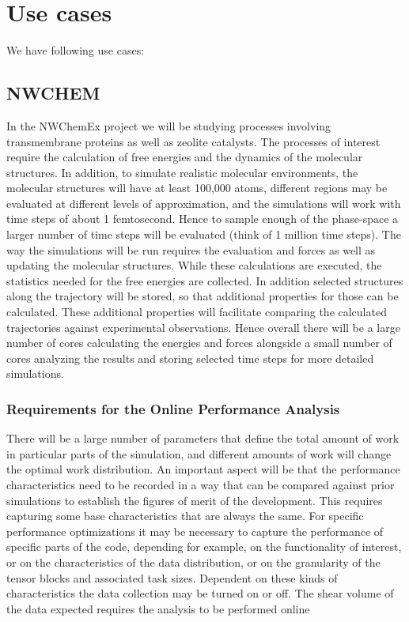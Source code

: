 \section{Use cases}
We have following use cases:

\subsection{NWCHEM}
In the NWChemEx project we will be studying processes involving transmembrane proteins as well as zeolite catalysts. The processes of interest require the calculation of free energies and the dynamics of the molecular structures. In addition, to simulate realistic molecular environments, the molecular structures will have at least 100,000 atoms, different regions may be evaluated at different levels of approximation, and the simulations will work with time steps of about 1 femtosecond.  Hence to sample enough of the phase-space a larger number of time steps will be evaluated (think of 1 million time steps). The way the simulations will be run requires the evaluation and forces as well as updating the molecular structures. While these calculations are executed, the statistics needed for the free energies are collected. In addition selected structures along the trajectory will be stored, so that additional properties for those can be calculated. These additional properties will facilitate comparing the calculated trajectories against experimental observations.  Hence overall there will be a large number of cores calculating the energies and forces alongside a small number of cores analyzing the results and storing selected time steps for more detailed simulations. 
\subsubsection{Requirements for the Online Performance Analysis}
There will be a large number of parameters that define the total amount of work in particular parts of the simulation, and different amounts of work will change the optimal work distribution. An important aspect will be that the performance characteristics need to be recorded in a way that can be compared against prior simulations to establish the figures of merit of the development. This requires capturing some base characteristics that are always the same. 
For specific performance optimizations it may be necessary to capture the performance of specific parts of the code, depending for example, on the functionality of interest, or on the characteristics of the data distribution, or on the granularity of the tensor blocks and associated task sizes. Dependent on these kinds of characteristics the data collection may be turned on or off. The shear volume of the data expected requires the analysis to be performed online


